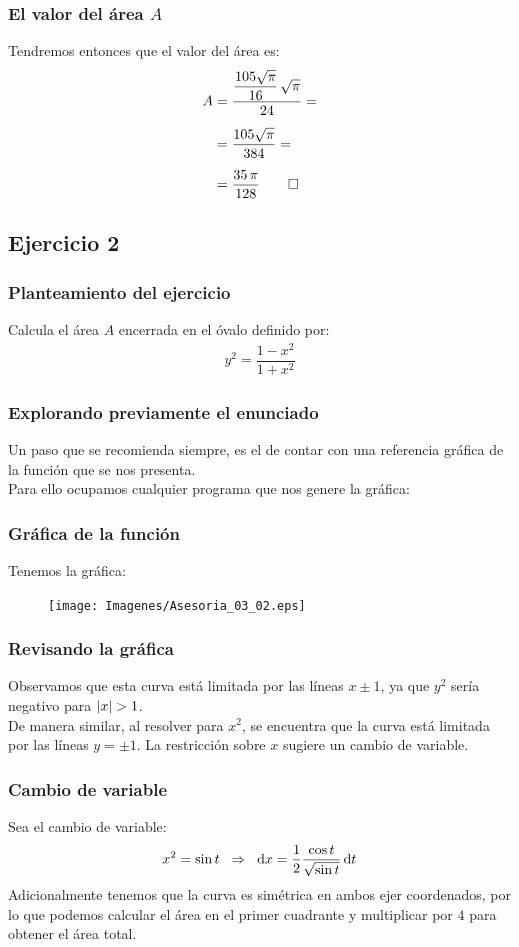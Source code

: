 \begin{frame}
\frametitle{El valor del área $A$}
Tendremos entonces que el valor del área es:
\begin{align*}
A &= \dfrac{\dfrac{105 \sqrt{\pi}}{16} \, \sqrt{\pi}}{24} = \\[0.5em]
&= \dfrac{105 \sqrt{\pi}}{384} = \\[0.5em]
&= \dfrac{35 \, \pi}{128} \qed
\end{align*}
\end{frame}

\subsection{Ejercicio 2}

\begin{frame}
\frametitle{Planteamiento del ejercicio}
Calcula el área $A$ encerrada en el óvalo definido por:
\begin{align*}
y^{2} = \dfrac{1 - x^{2}}{1 + x^{2}}
\end{align*}
\end{frame}
\begin{frame}
\frametitle{Explorando previamente el enunciado}
Un paso que se recomienda siempre, es el de contar con una referencia gráfica de la función que se nos presenta.
\\
\bigskip
\pause
Para ello ocupamos cualquier programa que nos genere la gráfica:
\end{frame}
\begin{frame}
\frametitle{Gráfica de la función}
Tenemos la gráfica:
\begin{figure}
    \centering
    \texttt{[image: Imagenes/Asesoria\_03\_02.eps]}
\end{figure}
\end{frame}
\begin{frame}
\frametitle{Revisando la gráfica}
Observamos que esta curva está limitada por las líneas $x \pm 1$, ya que $y^{2}$ sería negativo para $\abs{x} > 1$.
\\
\bigskip
\pause
De manera similar, al resolver para $x^{2}$, se encuentra que la curva está limitada por las líneas $y = \pm 1$. La restricción sobre $x$ sugiere un cambio de variable.
\end{frame}
\begin{frame}
\frametitle{Cambio de variable}
Sea el cambio de variable:
\begin{align*}
x^{2} = \sin t \hspace{0.2cm} \Rightarrow \hspace{0.2cm} \dd{x} = \dfrac{1}{2} \dfrac{\cos t}{\sqrt{\sin t}} \dd{t}
\end{align*}
\pause
Adicionalmente tenemos que la curva es simétrica en ambos ejer coordenados, por lo que podemos calcular el área en el primer cuadrante y multiplicar por $4$ para obtener el área total.
\end{frame}
